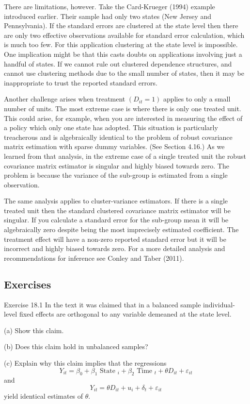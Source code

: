 \documentclass[10pt]{article}
\begin{document}
There are limitations, however. Take the Card-Krueger (1994) example introduced earlier. Their sample had only two states (New Jersey and Pennsylvania). If the standard errors are clustered at the state level then there are only two effective observations available for standard error calculation, which is much too few. For this application clustering at the state level is impossible. One implication might be that this casts doubts on applications involving just a handful of states. If we cannot rule out clustered dependence structures, and cannot use clustering methods due to the small number of states, then it may be inappropriate to trust the reported standard errors.

Another challenge arises when treatment $\left(D_{i t}=1\right)$ applies to only a small number of units. The most extreme case is where there is only one treated unit. This could arise, for example, when you are interested in measuring the effect of a policy which only one state has adopted. This situation is particularly treacherous and is algebraically identical to the problem of robust covariance matrix estimation with sparse dummy variables. (See Section 4.16.) As we learned from that analysis, in the extreme case of a single treated unit the robust covariance matrix estimator is singular and highly biased towards zero. The problem is because the variance of the sub-group is estimated from a single observation.

The same analysis applies to cluster-variance estimators. If there is a single treated unit then the standard clustered covariance matrix estimator will be singular. If you calculate a standard error for the sub-group mean it will be algebraically zero despite being the most imprecisely estimated coefficient. The treatment effect will have a non-zero reported standard error but it will be incorrect and highly biased towards zero. For a more detailed analysis and recommendations for inference see Conley and Taber (2011).

\subsection{Exercises}
Exercise 18.1 In the text it was claimed that in a balanced sample individual-level fixed effects are orthogonal to any variable demeaned at the state level.

(a) Show this claim.

(b) Does this claim hold in unbalanced samples?

(c) Explain why this claim implies that the regressions
$$
Y_{i t}=\beta_{0}+\beta_{1} \text { State }_{i}+\beta_{2} \text { Time }_{t}+\theta D_{i t}+\varepsilon_{i t}
$$
and
$$
Y_{i t}=\theta D_{i t}+u_{i}+\delta_{t}+\varepsilon_{i t}
$$
yield identical estimates of $\theta$.
\end{document}
